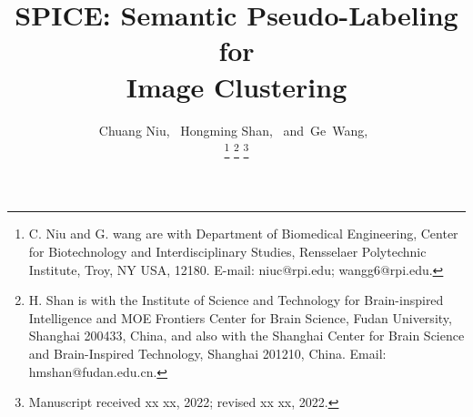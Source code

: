 \documentclass[journal]{IEEEtran}
\begin{document}
\title{SPICE: Semantic Pseudo-Labeling for \\ Image Clustering}


\author{Chuang Niu,~
        Hongming Shan,~
        and~Ge~Wang,~

\thanks{ C. Niu and G. wang are with Department of Biomedical Engineering, Center for Biotechnology and Interdisciplinary Studies, Rensselaer Polytechnic Institute, Troy, NY USA, 12180. E-mail: niuc@rpi.edu; wangg6@rpi.edu.}
\thanks{H. Shan is with the Institute of Science and Technology for Brain-inspired Intelligence and MOE Frontiers Center
for Brain Science, Fudan University, Shanghai 200433, China, and also with the Shanghai Center for Brain Science and Brain-Inspired
Technology, Shanghai 201210, China. Email: hmshan@fudan.edu.cn.}
\thanks{Manuscript received xx xx, 2022; revised xx xx, 2022.}}




















\maketitle
\end{document}
